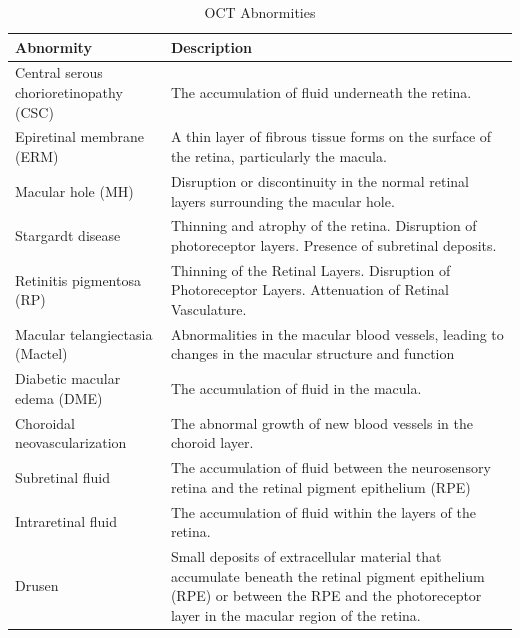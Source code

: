 \documentclass{article}
\begin{document}
	{
		\fontsize{9}{12}\selectfont
		{
			\begin{longtable}{lp{3.8in}}
				\caption{OCT Abnormities}
				\label{tb:oct-abnormites}\\
				\toprule
				Abnormity&Description\\
				\toprule
				
				\multicolumn{1}{l}{Central serous chorioretinopathy (CSC)}
				& \multicolumn{1}{l}{The accumulation of fluid underneath the retina.}\\
				
				\multicolumn{1}{l}{Epiretinal membrane (ERM)}
				& A thin layer of fibrous tissue forms on the surface of the retina, particularly the macula.\\
				
				\multicolumn{1}{l}{Macular hole (MH)}
				& Disruption or discontinuity in the normal retinal layers surrounding the macular hole.\\
				
				\multicolumn{1}{l}{Stargardt disease}
				& Thinning and atrophy of the retina. Disruption of photoreceptor layers. Presence of subretinal deposits.\\
				
				\multicolumn{1}{l}{Retinitis pigmentosa (RP)}
				& Thinning of the Retinal Layers. Disruption of Photoreceptor Layers. Attenuation of Retinal Vasculature.\\
				
				\multicolumn{1}{l}{Macular telangiectasia (Mactel)}
				& Abnormalities in the macular blood vessels, leading to changes in the macular structure and function\\
				
				\multicolumn{1}{l}{Diabetic macular edema (DME)}
				& The accumulation of fluid in the macula. \\
				
				\multicolumn{1}{l}{Choroidal neovascularization}
				& The abnormal growth of new blood vessels in the choroid layer.\\
				
				\multicolumn{1}{l}{Subretinal fluid}
				& The accumulation of fluid between the neurosensory retina and the retinal pigment epithelium (RPE)\\
				
				\multicolumn{1}{l}{Intraretinal fluid}
				& The accumulation of fluid within the layers of the retina.\\
				
				\multicolumn{1}{l}{Drusen}
				& Small deposits of extracellular material that accumulate beneath the retinal pigment epithelium (RPE) or between the RPE and the photoreceptor layer in the macular region of the retina.\\
				
				\bottomrule
			\end{longtable}
		}
	}
	
\end{document}
